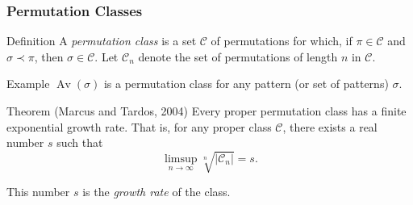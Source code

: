 \documentclass[xcolor=table,dvipsnames]{beamer}
\DeclareMathOperator{\Av}{Av}
\newcommand{\ra}{\rightarrow}
\newcommand{\sg}{\sigma}
\newcommand{\C}{\mathcal{C}}
\begin{document}
  \begin{frame} \frametitle{Permutation Classes} \pause
    \begin{block}{Definition}
      A \emph{permutation class} is a set $\C$ of permutations for which, if $\pi
      \in \C$ and $\sg \prec \pi$, then $\sg \in \C$. Let $\C_n$ denote the
      set of permutations of length $n$ in $\C$. 
    \end{block}

    \pause 
    \begin{block}{Example}
      $\Av(\sg)$ is a permutation class for any pattern (or set of patterns)
      $\sg$. 
    \end{block}

    \pause

    \begin{block}{Theorem (Marcus and Tardos, 2004)}
      Every proper permutation class has a finite exponential growth rate. That
      is, for any proper class $\C$, there exists a real number $s$ such that $$
      \limsup_{n \ra \infty} \sqrt[n]{|\C_n|} = s. $$

      This number $s$ is the \emph{growth rate} of the class. 
    \end{block}
  \end{frame}
\end{document}
